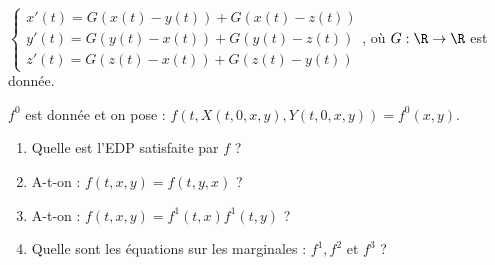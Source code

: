 \documentclass[12pt,a4paper]{article}
\begin{document}
		\begin{exo}$ $
			
			\begin{minipage}[t]{18cm}
				$\begin{cases}
				x'(t) = G(x(t)-y(t))+G(x(t)-z(t))\\
				y'(t) = G(y(t)-x(t)) + G(y(t)-z(t))\\
				z'(t) = G(z(t)-x(t)) + G(z(t)-y(t))
			\end{cases}$, où $G : \R \to \R$ est donnée.
			\end{minipage}
			
			$f^0$ est donnée et on pose : $f(t,X(t,0,x,y),Y(t,0,x,y)) = f^0(x,y)$.
			
			\begin{enumerate}
				\item Quelle est l'EDP satisfaite par $f$ ?
				\item  A-t-on : $f(t,x,y) = f(t,y,x)$ ?
				\item A-t-on : $f(t,x,y) = f^1(t,x)f^1(t,y)$ ?
				\item Quelle sont les équations sur les marginales : $f^1, f^2$ et $f^3$ ?
			\end{enumerate}
		\end{exo}
\end{document}
